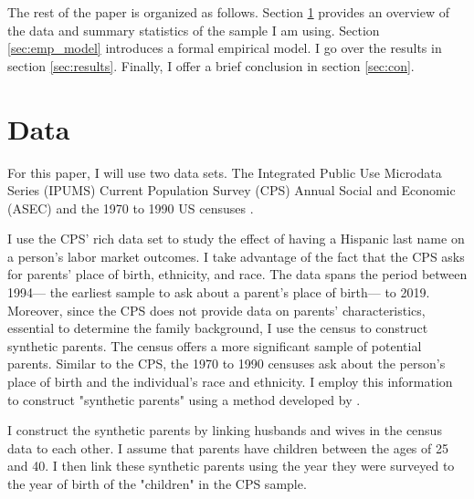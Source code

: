 \documentclass{wptemp}
\begin{document}
The rest of the paper is organized as follows. Section \ref{sec:data} provides an overview of the data and summary statistics of the sample I am using. Section \ref{sec:emp_model} introduces a formal empirical model. I go over the results in section \ref{sec:results}. Finally, I offer a brief conclusion in section \ref{sec:con}.

\section{Data}\label{sec:data}

For this paper, I will use two data sets. The Integrated Public Use Microdata Series (IPUMS) Current Population Survey (CPS) Annual Social and Economic (ASEC) \citep{cps2019} and the 1970 to 1990 US censuses \citep{acs2019}. 

I use the CPS' rich data set to study the effect of having a Hispanic last name on a person's labor market outcomes. I take advantage of the fact that the CPS asks for parents' place of birth, ethnicity, and race. The data spans the period between 1994--- the earliest sample to ask about a parent's place of birth--- to 2019. Moreover, since the CPS does not provide data on parents' characteristics, essential to determine the family background, I use the census to construct synthetic parents. The census offers a more significant sample of potential parents. Similar to the CPS, the 1970 to 1990 censuses ask about the person's place of birth and the individual's race and ethnicity. I employ this information to construct "synthetic parents" using a method developed by \citet{rubinstein2014pride}. 

I construct the synthetic parents by linking husbands and wives in the census data to each other. I assume that parents have children between the ages of 25 and 40. I then link these synthetic parents using the year they were surveyed to the year of birth of the "children" in the CPS sample.
\end{document}
